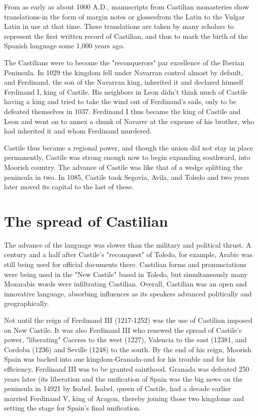 From as early as about 1000 A.D., manuscripts from Castilian
monasteries show translations-in the form of margin notes or glossesfrom the Latin to the Vulgar Latin in use at that time. These translations are taken by many scholars to represent the first written record
of Castilian, and thus to mark the birth of the Spanish language some
1,000 years ago.

The Castilians were to become the "reconquerors" par excellence of the Iberian Peninsula. In 1029 the kingdom fell under Navarran control almost by default, and Ferdinand, the son of the Navarran
king, inherited it and declared himself Ferdinand I, king of Castile. His
neighbors in Leon didn't think much of Castile having a king and tried
to take the wind out of Ferdinand's sails, only to be defeated themselves in 1037. Ferdinand I thus became the king of Castile and Leon
and went on to annex a chunk of Navarre at the expense of his brother,
who had inherited it and whom Ferdinand murdered.

Castile thus became a regional power, and though the union
did not stay in place permanently, Castile was strong enough now
to begin expanding southward, into Moorish country. The advance
of Castile was like that of a wedge splitting the peninsula in two.
In 1085, Castile took Segovia, Avila, and Toledo and two years later
moved its capital to the last of these.

\section{The spread of Castilian}

The advance of the language was slower than the military and
political thrust. A century and a half after Castile's "reconquest" of Toledo, for example, Arabic was still being used for official documents
there. Castilian forms and pronunciations were being used in the "New
Castile" based in Toledo, but simultaneously many Mozarabic words
were infiltrating Castilian. Overall, Castilian was an open and innovative language, absorbing influences as its speakers advanced politically
and geographically.

Not until the reign of Ferdinand III (1217-1252) was the use
of Castilian imposed on New Castile. It was also Ferdinand III who renewed the spread of Castile's power, "liberating" Caceres to the west
(1227), Valencia to the east (12381, and Cordoba (1236) and Seville
(1248) to the south. By the end of his reign, Moorish Spain was backed
into one kingdom-Granada-and for his trouble and for his efficiency,
Ferdinand III was to be granted sainthood. Granada was defeated 250
years later (its liberation and the unification of Spain was the big news
on the peninsula in 14921 by Isabel. Isabel, queen of Castile, had a decade earlier married Ferdinand V, king of Aragon, thereby joining those
two kingdoms and setting the stage for Spain's final unification.

